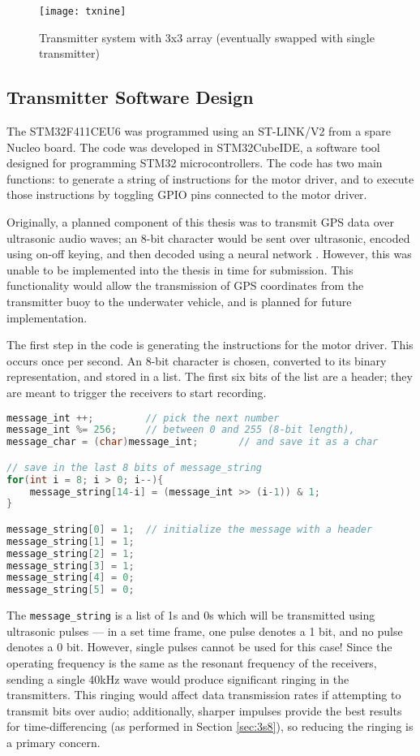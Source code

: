 \documentclass[11pt]{ucthesisCP}
\begin{document}
\begin{figure}[htbp]
	\centering
	\texttt{[image: txnine]}
	\caption{Transmitter system with 3x3 array (eventually swapped with single transmitter)}
	\label{fig:txnine}
\end{figure}

\subsection{Transmitter Software Design} \label{ssec:3s6s2}
The STM32F411CEU6 was programmed using an ST-LINK/V2 from a spare Nucleo board. The code was developed in STM32CubeIDE\textsuperscript{\textregistered}\xspace, a software tool designed for programming STM32 microcontrollers. The code has two main functions: to generate a string of instructions for the motor driver, and to execute those instructions by toggling GPIO pins connected to the motor driver. 

Originally, a planned component of this thesis was to transmit GPS data over ultrasonic audio waves; an 8-bit character would be sent over ultrasonic, encoded using on-off keying, and then decoded using a neural network \cite{ultrann}. However, this was unable to be implemented into the thesis in time for submission. This functionality would allow the transmission of GPS coordinates from the transmitter buoy to the underwater vehicle, and is planned for future implementation.

The first step in the code is generating the instructions for the motor driver. This occurs once per second. An 8-bit character is chosen, converted to its binary representation, and stored in a list. The first six bits of the list are a header; they are meant to trigger the receivers to start recording.

\begin{lstlisting}[language=C++]
message_int ++;			// pick the next number
message_int %= 256;		// between 0 and 255 (8-bit length),
message_char = (char)message_int;		// and save it as a char

// save in the last 8 bits of message_string
for(int i = 8; i > 0; i--){				
	message_string[14-i] = (message_int >> (i-1)) & 1;
}

message_string[0] = 1; 	// initialize the message with a header
message_string[1] = 1;
message_string[2] = 1;
message_string[3] = 1;
message_string[4] = 0;
message_string[5] = 0;
\end{lstlisting}

The \verb|message_string| is a list of 1s and 0s which will be transmitted using ultrasonic pulses --- in a set time frame, one pulse denotes a 1 bit, and no pulse denotes a 0 bit. However, single pulses cannot be used for this case! Since the operating frequency is the same as the resonant frequency of the receivers, sending a single 40kHz wave would produce significant ringing in the transmitters. This ringing would affect data transmission rates if attempting to transmit bits over audio; additionally, sharper impulses provide the best results for time-differencing (as performed in Section \ref{sec:3s8}), so reducing the ringing is a primary concern.
\end{document}
